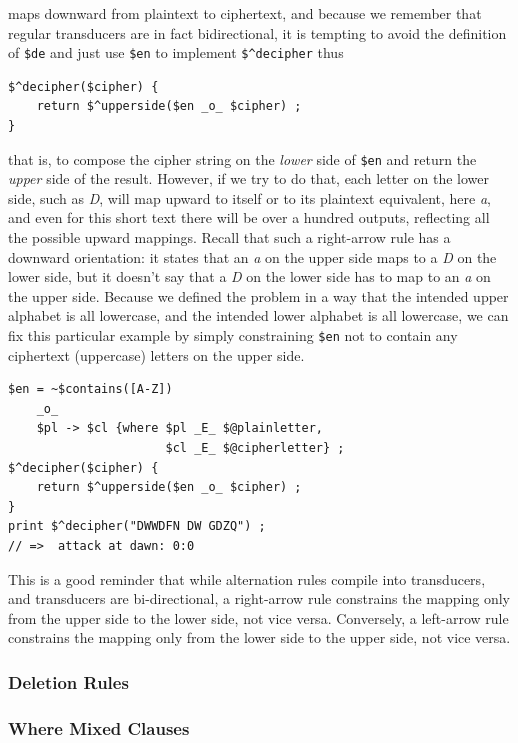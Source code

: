 \noindent
maps downward from plaintext to ciphertext, and because we remember that regular transducers are in fact bidirectional, it
is tempting to avoid the definition of \verb!$de! and just use \verb!$en! to implement \verb!$^decipher! thus


\begin{Verbatim}
$^decipher($cipher) {
    return $^upperside($en _o_ $cipher) ;
}
\end{Verbatim}

\noindent
that is, to compose the cipher string on the \emph{lower} side of \verb!$en! and return the \emph{upper} side of the
result.  However, if we try to do that, each letter on the lower side, such as \emph{D}, will map upward to itself or to its
plaintext equivalent, here \emph{a}, and even for this short text there will be over a hundred outputs, reflecting all the
possible upward mappings.  Recall that such
a right-arrow rule has a downward orientation:  it states that an \emph{a} on the upper side maps to a \emph{D} on the
lower side, but it doesn't say that a \emph{D} on the lower side has to map to an \emph{a} on the upper side.  Because we
defined the problem in a way that the intended upper alphabet is all lowercase, and the intended lower alphabet is all
lowercase, we can fix
this particular example by simply constraining \verb!$en! not to contain any ciphertext (uppercase) letters on the upper side.

\begin{Verbatim}
$en = ~$contains([A-Z])
	_o_
	$pl -> $cl {where $pl _E_ $@plainletter,
                      $cl _E_ $@cipherletter} ;
$^decipher($cipher) {
    return $^upperside($en _o_ $cipher) ;
}
print $^decipher("DWWDFN DW GDZQ") ;
// =>  attack at dawn: 0:0
\end{Verbatim}

\noindent
This is a good reminder that while alternation rules compile into transducers, and transducers are bi-directional, a
right-arrow rule constrains the mapping only from the upper side to the
lower side, not vice versa.  Conversely, a left-arrow rule constrains
the mapping only from the lower side to the upper side, not vice versa.

\subsubsection{Deletion Rules}

\subsubsection{Where Mixed Clauses}

